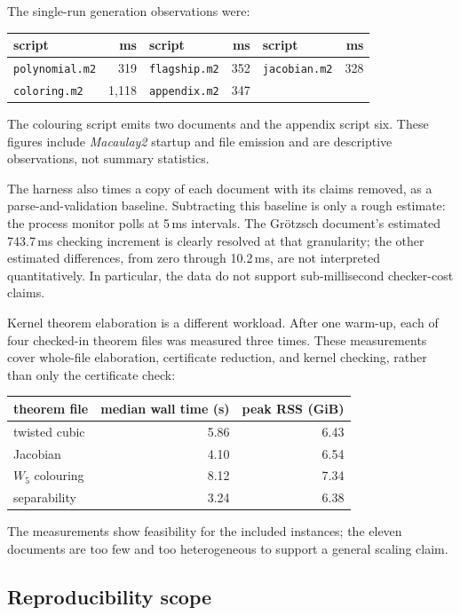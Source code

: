 \documentclass[11pt]{article}
\newcommand{\M}{\textit{Macaulay2}}
\newcommand{\code}[1]{\texttt{#1}}
\begin{document}
The single-run generation observations were:
\begin{center}
\small
\begin{tabular}{lrlrlr}
\toprule
script & ms & script & ms & script & ms \\
\midrule
\code{polynomial.m2} & 319 & \code{flagship.m2} & 352 & \code{jacobian.m2} & 328 \\
\code{coloring.m2} & 1,118 & \code{appendix.m2} & 347 & & \\
\bottomrule
\end{tabular}
\end{center}
The colouring script emits two documents and the appendix script six.
These figures include \M{} startup and file emission and are descriptive
observations, not summary statistics.

The harness also times a copy of each document with its claims removed,
as a parse-and-validation baseline.  Subtracting this baseline is only a
rough estimate: the process monitor polls at 5\,ms intervals.  The
Gr\"otzsch document's estimated 743.7\,ms checking increment is clearly
resolved at that granularity; the other estimated differences, from zero
through 10.2\,ms, are not interpreted quantitatively.  In particular,
the data do not support sub-millisecond checker-cost claims.

Kernel theorem elaboration is a different workload.  After one warm-up,
each of four checked-in theorem files was measured three times.  These
measurements cover whole-file elaboration, certificate reduction, and
kernel checking, rather than only the certificate check:
\begin{center}
\small
\begin{tabular}{lrr}
\toprule
theorem file & median wall time (s) & peak RSS (GiB) \\
\midrule
twisted cubic & 5.86 & 6.43 \\
Jacobian & 4.10 & 6.54 \\
$W_5$ colouring & 8.12 & 7.34 \\
separability & 3.24 & 6.38 \\
\bottomrule
\end{tabular}
\end{center}
The measurements show feasibility for the included instances; the eleven
documents are too few and too heterogeneous to support a general scaling
claim.

\subsection{Reproducibility scope}
\end{document}
